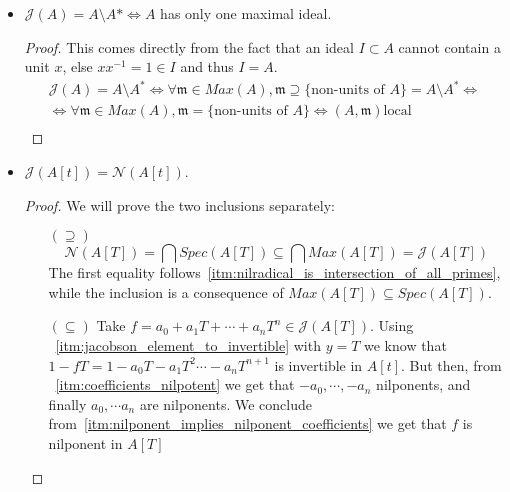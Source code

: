\begin{problem}
\begin{itemize}
        \item $\mathcal{J}(A) = A \setminus A* \Leftrightarrow A$ has only one maximal ideal.
            \begin{sol}
                \begin{proof}
                    This comes directly from the fact that an ideal $I \subset A$ cannot contain a unit $x$, else $x x^{-1} = 1 \in I$ and thus $I = A$.
                    \begin{gather*}
                        \mathcal{J}(A) = A \setminus A^* \Leftrightarrow \forall \mathfrak{m} \in Max(A), \mathfrak{m} \supseteq \{\text{non-units of }A\} = A \setminus A^* \Leftrightarrow\\
                        \Leftrightarrow \forall \mathfrak{m} \in Max(A), \mathfrak{m} = \{\text{non-units of }A\} \Leftrightarrow (A, \mathfrak{m}) \text{local}\\
                    \end{gather*}
                \end{proof}
            \end{sol}

        \item $\mathcal{J}(A[t]) = \mathcal{N}(A[t])$.
            \begin{sol}
                \begin{proof}
                We will prove the two inclusions separately:
                    \begin{itemize}
                        \item[$(\supseteq)$]
                        \[ \mathcal{N}(A[T]) = \bigcap Spec(A[T]) \subseteq \bigcap Max(A[T]) = \mathcal{J}(A[T]) \]
                        The first equality follows~\ref{itm:nilradical_is_intersection_of_all_primes}, while the inclusion is a consequence of $Max(A[T]) \subseteq Spec(A[T])$.
                        \item[$(\subseteq)$]
                        Take $f = a_0 + a_1 T + \cdots + a_n T^n \in \mathcal{J}(A[T])$.
                        Using ~\ref{itm:jacobson_element_to_invertible} with $y = T$ we know that $1 - f T = 1 - a_0 T - a_1 T^2 \cdots - a_n T^{n + 1}$ is invertible in $A[t]$.
                        But then, from ~\ref{itm:coefficients_nilpotent} we get that $-a_0, \cdots, -a_n$ nilponents, and finally $a_0, \cdots a_n$ are nilponents.
                        We conclude from~\ref{itm:nilponent_implies_nilponent_coefficients} we get that $f$ is nilponent in $A[T]$
                    \end{itemize}
                \end{proof}
            \end{sol}
    \end{itemize}
\end{problem}

